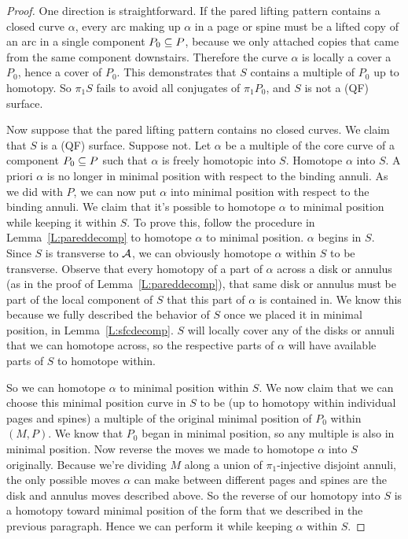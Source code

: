 \begin{proof}

One direction is straightforward. If the pared lifting pattern contains
a closed curve $\alpha$, every arc making up $\alpha$ in a page or spine must
be a lifted copy of an arc in a single component $P_0 \subseteq P$, because we only
attached copies that came from the same component downstairs. Therefore the
curve $\alpha$ is locally a cover a $P_0$, hence a cover of $P_0$. This
demonstrates that $S$ contains a multiple of $P_0$ up to homotopy. So $\pi_1S$
fails to avoid all conjugates of $\pi_1P_0$, and $S$ is not a (QF) surface.

Now suppose that the pared lifting pattern contains no closed curves. We claim
that $S$ is a (QF) surface. Suppose not. Let $\alpha$ be a multiple of the core
curve of a component $P_0 \subseteq  P$ such that $\alpha$ is freely homotopic into
$S$.  Homotope $\alpha$ into $S$. A priori $\alpha$ is no longer in minimal
position with respect to the binding annuli. As we did with $P$, we can now put
$\alpha$ into minimal position with respect to the binding annuli.  We claim
that it's possible to homotope $\alpha$ to minimal position while keeping it
within $S$.  To prove this, follow the procedure in Lemma~\ref{L:pareddecomp}
to homotope $\alpha$ to minimal position.  $\alpha$ begins in $S$.  Since $S$
is transverse to $\mathcal{A}$, we can obviously homotope $\alpha$ within $S$ to be
transverse.  Observe that every homotopy of a part of $\alpha$ across a disk or
annulus (as in the proof of Lemma~\ref{L:pareddecomp}), that same disk or
annulus must be part of the local component of $S$ that this part of $\alpha$
is contained in.  We know this because we fully described the behavior of $S$
once we placed it in minimal position, in Lemma~\ref{L:sfcdecomp}.  $S$ will
locally cover any of the disks or annuli that we can homotope across, so the
respective parts of $\alpha$ will have available parts of $S$ to homotope
within.

So we can homotope $\alpha$ to minimal position within $S$. We now claim that
we can choose this minimal position curve in $S$ to be (up to homotopy within
individual pages and spines) a multiple of the original minimal position of
$P_0$ within $(M,P)$. We know that $P_0$ began in minimal position, so any
multiple is also in minimal position. Now reverse the moves we made to homotope
$\alpha$ into $S$ originally. Because we're dividing $M$ along a union of
$\pi_1$-injective disjoint annuli, the only possible moves $\alpha$ can make
between different pages and spines are the disk and annulus moves described
above. So the reverse of our homotopy into $S$ is a homotopy toward minimal
position of the form that we described in the previous paragraph. Hence we can
perform it while keeping $\alpha$ within $S$.


\end{proof}
